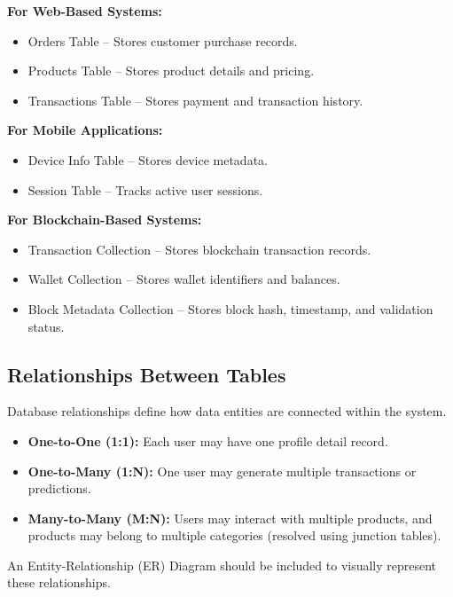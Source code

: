\textbf{For Web-Based Systems:}
\begin{itemize}
    \item Orders Table – Stores customer purchase records.
    \item Products Table – Stores product details and pricing.
    \item Transactions Table – Stores payment and transaction history.
\end{itemize}

\textbf{For Mobile Applications:}
\begin{itemize}
    \item Device Info Table – Stores device metadata.
    \item Session Table – Tracks active user sessions.
\end{itemize}

\textbf{For Blockchain-Based Systems:}
\begin{itemize}
    \item Transaction Collection – Stores blockchain transaction records.
    \item Wallet Collection – Stores wallet identifiers and balances.
    \item Block Metadata Collection – Stores block hash, timestamp, and validation status.
\end{itemize}



\subsection{Relationships Between Tables}

Database relationships define how data entities are connected within the system.

\begin{itemize}
    \item \textbf{One-to-One (1:1):} Each user may have one profile detail record.
    \item \textbf{One-to-Many (1:N):} One user may generate multiple transactions or predictions.
    \item \textbf{Many-to-Many (M:N):} Users may interact with multiple products, and products may belong to multiple categories (resolved using junction tables).
\end{itemize}

An Entity-Relationship (ER) Diagram should be included to visually represent these relationships.



